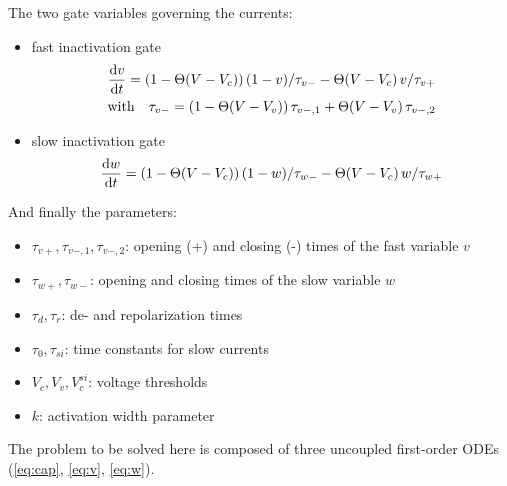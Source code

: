 The two gate variables governing the currents:
\begin{itemize}
    \item fast inactivation gate
        \begin{gather}
            \dv{v}{t}=(1-\Theta(V-V_c))\,(1-v)/\tau_{v-}
            -\Theta(V-V_c)\,v/\tau_{v+} \label{eq:v} \\
            \qq*{with}
            \tau_{v-}=(1-\Theta(V-V_v))\,\tau_{v-,1}
                +\Theta(V-V_v)\,\tau_{v-,2} \nonumber
        \end{gather}
    \item slow inactivation gate
        \begin{equation}
            \dv{w}{t}=(1-\Theta(V-V_c))\,(1-w)/\tau_{w-}
            -\Theta(V-V_c)\,w/\tau_{w+} \label{eq:w}
        \end{equation}
\end{itemize}

And finally the parameters:
\begin{itemize}
    \item $\tau_{v+}, \tau_{v-,1}, \tau_{v-,2}$: opening (+) and closing (-)
        times of the fast variable $v$
    \item $\tau_{w+}, \tau_{w-}$: opening and closing times of the slow
        variable $w$
    \item $\tau_d, \tau_r$: de- and repolarization times
    \item $\tau_0, \tau_{si}$: time constants for slow currents
    \item $V_c, V_v, V_{c}^{si}$: voltage thresholds
    \item $k$: activation width parameter
\end{itemize}

The problem to be solved here is composed of three uncoupled first-order
ODEs (\ref{eq:cap}, \ref{eq:v}, \ref{eq:w}).


